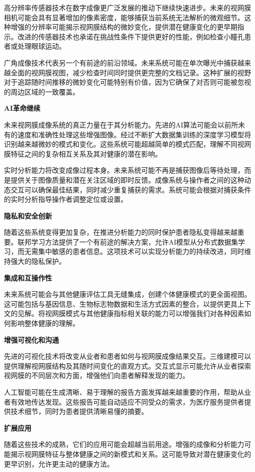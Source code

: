 \documentclass[
  Letterpaper,
]{scrbook}
\begin{document}
高分辨率传感器技术在数字成像更广泛发展的推动下继续快速进步。未来的视网膜相机可能会具有显著增加的像素密度，能够捕获当前系统无法解析的微观细节。这种增强的分辨率可能揭示视网膜结构的微妙变化，提供潜在健康变化的更早期指示。改进的传感器技术也承诺在挑战性条件下提供更好的性能，例如检查小瞳孔患者或处理眼球运动。

广角成像技术代表另一个有前途的前沿领域。未来系统可能在单次曝光中捕获越来越全面的视网膜视图，减少检查时间同时提供更完整的文档记录。这种扩展的视野对于追踪随时间推移的微妙变化可能特别有价值，因为它确保了对否则可能被忽视的周边区域的一致覆盖。

\textbf{AI革命继续}

未来视网膜成像系统的真正力量在于其分析能力。先进的AI算法可能会以前所未有的速度和准确性处理这些增强图像。经过不断扩大数据集训练的深度学习模型将识别越来越微妙的模式和变化。这些系统可能超越简单的模式匹配，理解不同视网膜特征之间的复杂相互关系及其对健康的潜在影响。

实时分析能力将改变成像过程本身。未来系统可能不再是捕获图像后等待处理，而是提供关于图像质量和潜在关注区域的即时反馈。成像系统与操作者之间的这种动态交互可以确保最佳结果，同时减少重复捕获的需求。系统可能会根据对捕获条件的实时分析指导操作者调整定位或设置。

\textbf{隐私和安全创新}

随着这些系统变得更加复杂，在推进分析能力的同时保护患者隐私变得越来越重要。联邦学习方法提供了一个有前途的解决方案，允许AI模型从分布式数据集学习，而无需集中敏感的患者信息。这项技术可以实现分析能力的持续改进，同时维持强大的隐私保护。

\textbf{集成和互操作性}

未来系统可能会与其他健康评估工具无缝集成，创建个体健康模式的更全面视图。这可能包括与基因信息、生物标志物数据和生活方式因素的整合，以提供更具上下文的见解。将视网膜模式与其他健康指标相关联的能力可以增强我们对各种因素如何影响整体健康的理解。

\textbf{增强可视化和沟通}

先进的可视化技术将改变从业者和患者如何与视网膜成像结果交互。三维建模可以提供理解视网膜结构及其随时间变化的直观方式。交互式显示可能允许从业者探索视网膜的不同层次和方面，增强他们向患者解释发现的能力。

人工智能可能在生成清晰、易于理解的报告方面发挥越来越重要的作用，帮助从业者有效地传达发现。这些报告可能自动适应不同受众的需求，为医疗服务提供者提供技术细节，同时为患者提供清晰易懂的摘要。

\textbf{扩展应用}

随着这些技术的成熟，它们的应用可能会超越当前用途。增强的成像和分析能力可能揭示视网膜特征与整体健康之间的新模式和关系。这可能导致对潜在健康变化的更早识别，允许更主动的健康方法。
\end{document}
